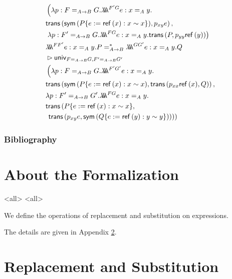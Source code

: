 \begin{align*}
& \left( \lambda p : F =_{A \rightarrow B} G .
\triplelambda^{F' G} e : x =_A y. \right. \\
& \trans{\sym{P\{e := \reff{x} : x \sim x\}}}
{p_{xy}e}, \\
& \left. \lambda p:F'=_{A \rightarrow B} G. \triplelambda^{FG} e : x =_A y.
\trans{P}{p_{yy} \reff{y}} \right) \\
\lefteqn{\triplelambda^{F F'} e : x =_A y. P =^*_{A \rightarrow B} \triplelambda^{G G'} e : x =_A y . Q} \\
& \rhd 
\mathsf{univ}_{F =_{A \rightarrow B} G,F' =_{A \rightarrow B} G'} \\
& \left( \lambda p : F =_{A \rightarrow B} G . \triplelambda^{F' G'} e : x =_A y. \right. \\
& \trans{\sym{P\{e := \reff{x} : x \sim x}}{\trans{p_{xx} \reff{x}}{Q}} , \\
& \lambda p : F' =_{A \rightarrow B} G' . \triplelambda^{FG} e : x =_A y. \\
& \mathsf{trans} \left( P \{ e := \reff{x} : x \sim x \} , \right. \\
& \left. \left. \trans{p_{xy} e}{\sym{Q \{e := \reff{y} : y \sim y \}}} \right) \right)
\end{align*}

\todos

\begin{frame}
\frametitle{Bibliography}

\end{frame}

\appendix

\section{About the Formalization}


\mode<all>{}
\mode<all>{}

We define the operations of replacement and substitution on
expressions.  




The details are given in Appendix \ref{appendix:repsub}.




%
%
%

\section{Replacement and Substitution}
\label{appendix:repsub}













